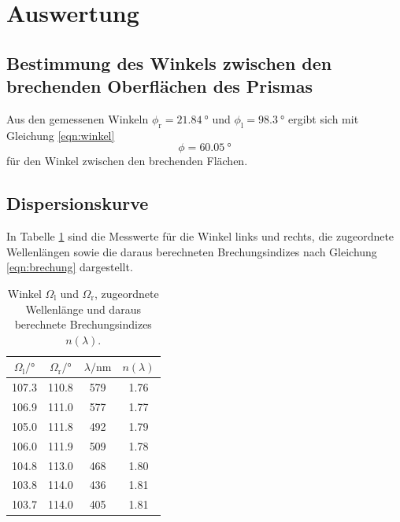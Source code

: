 \section{Auswertung}
\label{sec:Auswertung}
\subsection{Bestimmung des Winkels zwischen den brechenden Oberflächen des Prismas}
Aus den gemessenen Winkeln $\phi_\mathrm{r}=\SI{21.84}{\degree}$ und $\phi_\mathrm{l}=\SI{98.3}{\degree}$ ergibt sich mit Gleichung \ref{eqn:winkel}
\begin{equation}
  \phi=\SI{60.05}{\degree}
\end{equation}
für den Winkel zwischen den brechenden Flächen.

\subsection{Dispersionskurve}

In Tabelle \ref{tab:messwerte} sind die Messwerte für die Winkel links und rechts, die zugeordnete Wellenlängen sowie die daraus berechneten Brechungsindizes nach Gleichung \ref{eqn:brechung} dargestellt.

\begin{table}
  \caption{Winkel $\Omega_\mathrm{l}$ und $\Omega_\mathrm{r}$, zugeordnete Wellenlänge und daraus berechnete Brechungsindizes $n(\lambda)$.}
  \centering
  \label{tab:messwerte}
  \begin{tabular}{c c c c}
  \toprule
   $\Omega_\mathrm{l}/\si{\degree}$ & $\Omega_\mathrm{r}/\si{\degree}$ & $\lambda/\si{\nano\meter}$ & $n(\lambda)$\\
 \midrule
107.3 & 110.8 & 579 & 1.76 \\
106.9 & 111.0 & 577 & 1.77 \\
105.0 & 111.8 & 492 & 1.79 \\
106.0 & 111.9 & 509 & 1.78 \\
104.8 & 113.0 & 468 & 1.80 \\
103.8 & 114.0 & 436 & 1.81 \\
103.7 & 114.0 & 405 & 1.81 \\
\bottomrule
\end{tabular}
\end{table}

